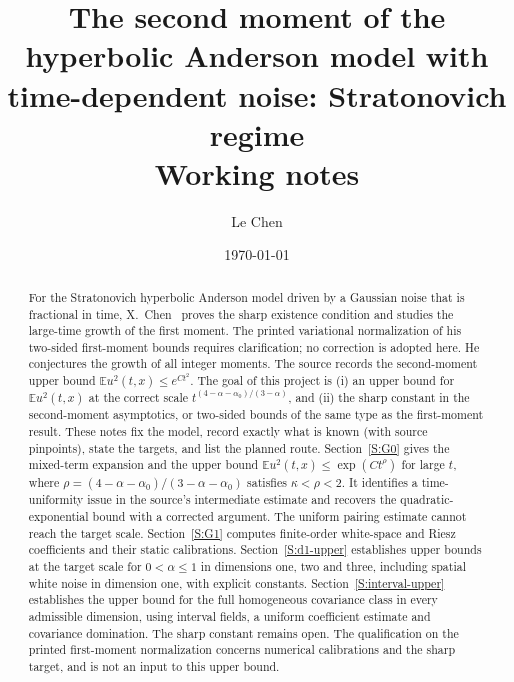 \documentclass[12pt]{article}
\numberwithin{equation}{section}
\theoremstyle{definition}
\newcommand{\E}{\mathbb{E}}
\begin{document}
\title{The second moment of the hyperbolic Anderson model with time-dependent
noise: Stratonovich regime\\[0.3em]
{\normalsize Working notes}}
\author{Le Chen}
\date{\today}
\maketitle

\begin{abstract}
  For the Stratonovich hyperbolic Anderson model driven by a Gaussian noise
  that is fractional in time, X.~Chen~\cite{chen:author2026:time-dependency}
  proves the sharp existence condition and studies the large-time growth
  of the first moment. The printed variational normalization of his
  two-sided first-moment bounds requires clarification; no correction is
  adopted here. He conjectures the growth of all integer moments. The source records the second-moment upper bound
  $\E u^2(t,x)\le e^{Ct^2}$. The goal of this project is (i) an upper bound
  for $\E u^2(t,x)$ at the correct scale
  $t^{(4-\alpha-\alpha_0)/(3-\alpha)}$, and (ii) the sharp constant in the
  second-moment asymptotics, or two-sided bounds of the same type as the
  first-moment result. These notes fix the model, record exactly what is
  known (with source pinpoints), state the targets, and list the planned
  route. Section~\ref{S:G0} gives the mixed-term expansion and the upper
  bound $\E u^2(t,x)\le\exp(Ct^\rho)$ for large $t$, where
  $\rho=(4-\alpha-\alpha_0)/(3-\alpha-\alpha_0)$ satisfies
  $\kappa<\rho<2$. It identifies a time-uniformity issue in the source's
  intermediate estimate and recovers the quadratic-exponential bound
  with a corrected argument. The uniform pairing estimate cannot reach
  the target scale. Section~\ref{S:G1} computes finite-order white-space
  and Riesz coefficients and their static calibrations.
  Section~\ref{S:d1-upper} establishes upper bounds at the target
  scale for $0<\alpha\le1$ in dimensions one, two and three, including
  spatial white noise in dimension one, with explicit constants.
  Section~\ref{S:interval-upper} establishes the upper bound for the
  full homogeneous covariance class in every admissible dimension,
  using interval fields, a uniform coefficient estimate and covariance
  domination. The sharp constant remains open. The qualification on the
  printed first-moment normalization concerns numerical calibrations and
  the sharp target, and is not an input to this upper bound.
\end{abstract}
\end{document}
